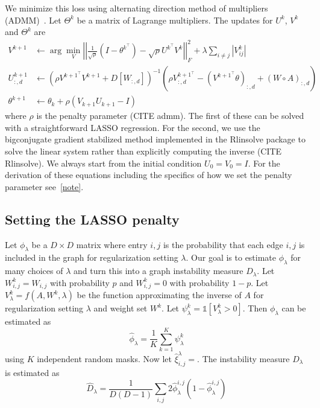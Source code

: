 \documentclass{article}
\begin{document}
We minimize this loss using alternating direction method of multipliers (ADMM)~\cite{Boyd2010}.
Let $\Theta^k$ be a matrix of Lagrange multipliers. The updates for $U^k$, $V^k$ and $\Theta^k$
are
\begin{align}
V^{k+1} &\leftarrow \arg \min_{V} \left|\left|\frac{1}{\sqrt{\rho}}\left(I-\theta^{k^\top}\right) -
      \sqrt{\rho} U^{k^\top} V^k\right|\right|_F^2 + \lambda \sum_{i\neq j} \left|V^k_{ij} \right| \\
U_{:, d}^{k+1} &\leftarrow \left(\rho V^{k+1 ^ \top} V^{k+1} + D[W_{:, d}]\right)^{-1} \left(\rho V^{k+1 ^ \top}_{:, d} -
  \left(V^{k+1 ^ \top} \theta\right)_{:, d} + (W \circ A)_{:, d}\right) \\
\theta^{k+1} &\leftarrow \theta_{k} + \rho(V_{k+1}U_{k+1}-I)
\end{align}
where $\rho$ is the penalty parameter (CITE admm).
The first of these can be solved with a straightforward LASSO regression. For the second,
we use the bigconjugate gradient stabilized method implemented
in the Rlinsolve package to solve the linear system
rather than explicitly computing the inverse (CITE Rlinsolve).
We always start from the initial condition $U_0 = V_0 = I$.
 For the derivation of these equations including
the specifics of how we set
the penalty parameter see~\ref{note}.

\subsection{Setting the LASSO penalty}
Let $\phi_{\lambda}$ be a $D\times D$ matrix where entry $i, j$ is the probability that each edge
$i,j$ is included in the graph for regularization setting $\lambda$. Our goal is to
estimate $\phi_{\lambda}$ for many choices of $\lambda$ and
turn this into a graph instability measure $D_\lambda$.
Let $W^k_{i,j} = W_{i,j}$ with probability $p$ and $W^k_{i,j} = 0$ with
probability $1-p$. Let $V_{\lambda}^k = f(A, W^k, \lambda)$ be
 the function approximating the inverse of
$A$ for regularization setting
$\lambda$ and weight set $W^k$. Let $\psi^k_{\lambda} = \mathds{1}[V^k_{\lambda} > 0]$.
Then  $\phi_{\lambda}$ can be estimated as
\begin{equation}
\hat{\phi}_{\lambda} = \frac{1}{K} \sum_{k=1}^K \psi^{k}_{\lambda}
\end{equation}
using $K$ independent random masks. Now let
$\hat{\xi}_{i,j}^\lambda = $.
The instability measure $D_\lambda$ is estimated as~\cite{Liu2010}
\begin{equation}
\hat{D}_\lambda = \frac{1}{D(D-1)} \sum_{i, j} 2 \hat{\phi}^{i, j}_\lambda(1-\hat{\phi}^{i, j}_\lambda)
\end{equation}
\end{document}
